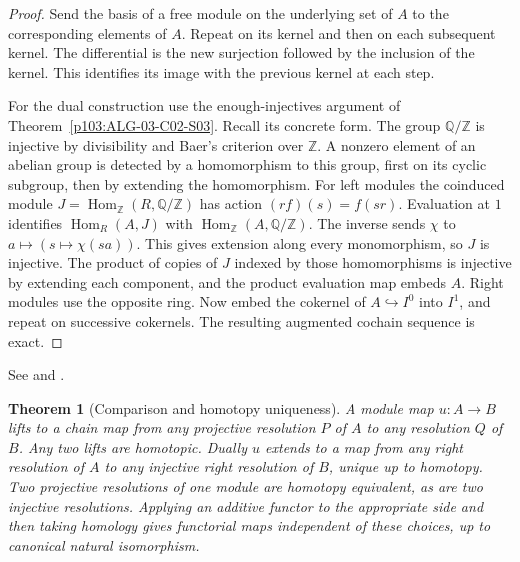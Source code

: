 \documentclass[11pt,oneside,openany]{book}
\newtheorem{theorem}{Theorem}[chapter]
\theoremstyle{definition}
\theoremstyle{remark}
\begin{document}
\begin{proof}
Send the basis of a free module on the underlying set of \(A\) to
the corresponding elements of \(A\). Repeat on its kernel and then
on each subsequent kernel. The differential is the new surjection
followed by the inclusion of the kernel. This identifies its image
with the previous kernel at each step.

For the dual construction use the enough-injectives argument of
Theorem~\ref{p103:ALG-03-C02-S03}. Recall its concrete form.
The group \(\mathbb Q/\mathbb Z\) is injective by divisibility and
Baer's criterion over \(\mathbb Z\). A nonzero element of an
abelian group is detected by a homomorphism to this group, first
on its cyclic subgroup, then by extending the homomorphism.
For left modules the coinduced module
\(J=\operatorname{Hom}_{\mathbb Z}(R,\mathbb Q/\mathbb Z)\) has
action \((r f)(s)=f(sr)\). Evaluation at \(1\) identifies
\(\operatorname{Hom}_R(A,J)\) with
\(\operatorname{Hom}_{\mathbb Z}(A,\mathbb Q/\mathbb Z)\).
The inverse sends \(\chi\) to \(a\mapsto(s\mapsto\chi(sa))\).
This gives extension along every monomorphism, so \(J\) is
injective. The product of copies of \(J\) indexed by those
homomorphisms is injective by extending each component, and the
product evaluation map embeds \(A\). Right modules use the
opposite ring. Now embed the cokernel of \(A\hookrightarrow I^0\)
into \(I^1\), and repeat on successive cokernels. The resulting
augmented cochain sequence is exact.
\end{proof}

See \cite[\S\S2.2--2.3]{weibel} and
\cite[\S6.1, Proposition 6.4]{rotman}.

\begin{theorem}[Comparison and homotopy uniqueness]
\label{p103:ALG-10-C02-R02}
A module map \(u:A\to B\) lifts to a chain map from any projective
resolution \(P\) of \(A\) to any resolution \(Q\) of \(B\).
Any two lifts are homotopic. Dually \(u\) extends to a map from
any right resolution of \(A\) to any injective right resolution
of \(B\), unique up to homotopy. Two projective resolutions of
one module are homotopy equivalent, as are two injective
resolutions. Applying an additive functor to the appropriate
side and then taking homology gives functorial maps independent
of these choices, up to canonical natural isomorphism.
\end{theorem}
\end{document}

